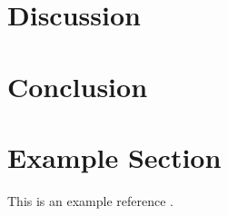 \documentclass[a4paper, titlepage]{article}
\begin{document}
\section{Discussion}



\section{Conclusion}

\clearpage


\clearpage
\appendix

\section{Example Section}
This is an example reference \citep{glad00}.



\end{document}
